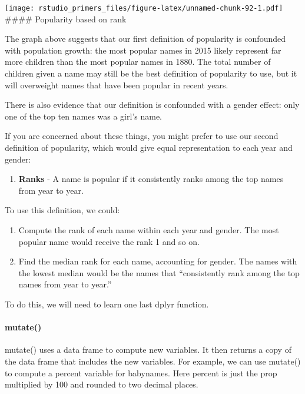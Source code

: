 \documentclass[
]{article}
\providecommand{\tightlist}{%
  \setlength{\itemsep}{0pt}\setlength{\parskip}{0pt}}
\begin{document}
\texttt{[image: rstudio\_primers\_files/figure-latex/unnamed-chunk-92-1.pdf]}
\#\#\#\# Popularity based on rank

The graph above suggests that our first definition of popularity is
confounded with population growth: the most popular names in 2015 likely
represent far more children than the most popular names in 1880. The
total number of children given a name may still be the best definition
of popularity to use, but it will overweight names that have been
popular in recent years.

There is also evidence that our definition is confounded with a gender
effect: only one of the top ten names was a girl's name.

If you are concerned about these things, you might prefer to use our
second definition of popularity, which would give equal representation
to each year and gender:

\begin{enumerate}
\def\labelenumi{\arabic{enumi}.}
\setcounter{enumi}{1}
\tightlist
\item
  \textbf{Ranks} - A name is popular if it consistently ranks among the
  top names from year to year.
\end{enumerate}

To use this definition, we could:

\begin{enumerate}
\def\labelenumi{\arabic{enumi}.}
\tightlist
\item
  Compute the rank of each name within each year and gender. The most
  popular name would receive the rank 1 and so on.
\item
  Find the median rank for each name, accounting for gender. The names
  with the lowest median would be the names that ``consistently rank
  among the top names from year to year.''
\end{enumerate}

To do this, we will need to learn one last dplyr function.

\hypertarget{mutate-1}{%
\paragraph{mutate()}\label{mutate-1}}

mutate() uses a data frame to compute new variables. It then returns a
copy of the data frame that includes the new variables. For example, we
can use mutate() to compute a percent variable for babynames. Here
percent is just the prop multiplied by 100 and rounded to two decimal
places.
\end{document}
